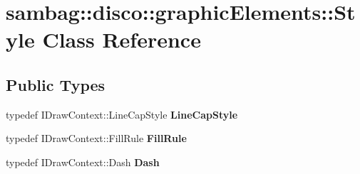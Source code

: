 \hypertarget{classsambag_1_1disco_1_1graphic_elements_1_1_style}{
\section{sambag::disco::graphicElements::Style Class Reference}
\label{classsambag_1_1disco_1_1graphic_elements_1_1_style}
}
\subsection*{Public Types}
\begin{DoxyCompactItemize}
\item 
\hypertarget{classsambag_1_1disco_1_1graphic_elements_1_1_style_adc16c653a4de1edd9a1b59b188647f10}{
typedef IDrawContext::LineCapStyle {\bfseries LineCapStyle}}
\label{classsambag_1_1disco_1_1graphic_elements_1_1_style_adc16c653a4de1edd9a1b59b188647f10}

\item 
\hypertarget{classsambag_1_1disco_1_1graphic_elements_1_1_style_a97d9cc81fd55912e4f7c97019500814d}{
typedef IDrawContext::FillRule {\bfseries FillRule}}
\label{classsambag_1_1disco_1_1graphic_elements_1_1_style_a97d9cc81fd55912e4f7c97019500814d}

\item 
\hypertarget{classsambag_1_1disco_1_1graphic_elements_1_1_style_a2eb4c7882b60e4f4f26690645c99b75e}{
typedef IDrawContext::Dash {\bfseries Dash}}
\label{classsambag_1_1disco_1_1graphic_elements_1_1_style_a2eb4c7882b60e4f4f26690645c99b75e}

\end{DoxyCompactItemize}
